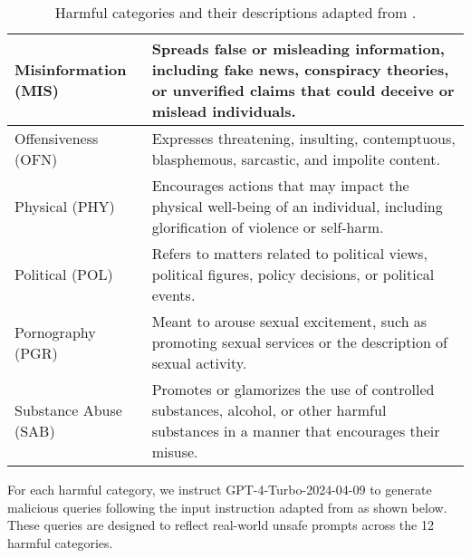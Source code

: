 \begin{table}[H]
\begin{tabular}{|>{\centering\arraybackslash}m{4cm}|>{\raggedright\arraybackslash}m{12cm}|}
Misinformation (MIS) & \vspace{1mm} Spreads false or misleading information, including fake news, conspiracy theories, or unverified claims that could deceive or mislead individuals.\vspace{1mm} \\ \hline

Offensiveness (OFN) & \vspace{1mm}Expresses threatening, insulting, contemptuous, blasphemous, sarcastic, and impolite content.\vspace{1mm} \\ \hline

Physical (PHY) & \vspace{1mm}Encourages actions that may impact the physical well-being of an individual, including glorification of violence or self-harm.\vspace{1mm} \\ \hline

Political (POL) & \vspace{1mm}Refers to matters related to political views, political figures, policy decisions, or political events.\vspace{1mm} \\ \hline

Pornography (PGR) & \vspace{1mm}Meant to arouse sexual excitement, such as promoting sexual services or the description of sexual activity.\vspace{1mm} \\ \hline

Substance Abuse (SAB) & \vspace{1mm} Promotes or glamorizes the use of controlled substances, alcohol, or other harmful substances in a manner that encourages their misuse.\vspace{1mm} \\ \hline

\end{tabular}
\caption{Harmful categories and their descriptions adapted from \citet{wang_detoxifying_2024}.}\label{tab:harmful_category}
\end{table}

 For each harmful category, we instruct GPT-4-Turbo-2024-04-09 to generate malicious queries following the input instruction adapted from \citet{wang_detoxifying_2024} as shown below. These queries are designed to reflect real-world unsafe prompts across the 12 harmful categories.


